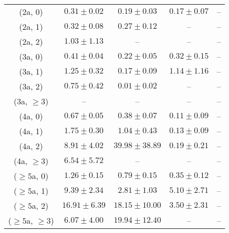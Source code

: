 \begin{table}[h!]
{\begin{tabular}{ccccc}
	(2a, 0) & $0.31\pm 0.02$ & $0.19\pm 0.03$ & $0.17\pm 0.07$ & -- \\[0.5ex] 
	(2a, 1) & $0.32\pm 0.08$ & $0.27\pm 0.12$ & -- & -- \\[0.5ex] 
	(2a, 2) & $1.03\pm 1.13$ & -- & -- & -- \\[0.5ex] 
	(3a, 0) & $0.41\pm 0.04$ & $0.22\pm 0.05$ & $0.32\pm 0.15$ & -- \\[0.5ex] 
	(3a, 1) & $1.25\pm 0.32$ & $0.17\pm 0.09$ & $1.14\pm 1.16$ & -- \\[0.5ex] 
	(3a, 2) & $0.75\pm 0.42$ & $0.01\pm 0.02$ & -- & -- \\[0.5ex] 
	(3a, $\ge3$) & -- & -- & -- & -- \\[0.5ex] 
	(4a, 0) & $0.67\pm 0.05$ & $0.38\pm 0.07$ & $0.11\pm 0.09$ & -- \\[0.5ex] 
	(4a, 1) & $1.75\pm 0.30$ & $1.04\pm 0.43$ & $0.13\pm 0.09$ & -- \\[0.5ex] 
	(4a, 2) & $8.91\pm 4.02$ & $39.98\pm 38.89$ & $0.19\pm 0.21$ & -- \\[0.5ex] 
	(4a, $\ge3$) & $6.54\pm 5.72$ & -- & -- & -- \\[0.5ex] 
	($\ge5$a, 0) & $1.26\pm 0.15$ & $0.79\pm 0.15$ & $0.35\pm 0.12$ & -- \\[0.5ex] 
	($\ge5$a, 1) & $9.39\pm 2.34$ & $2.81\pm 1.03$ & $5.10\pm 2.71$ & -- \\[0.5ex] 
	($\ge5$a, 2) & $16.91\pm 6.39$ & $18.15\pm 10.00$ & $3.50\pm 2.31$ & -- \\[0.5ex] 
	($\ge5$a, $\ge3$) & $6.07\pm 4.00$ & $19.94\pm 12.40$ & -- & -- \\[0.5ex] 
	\hline
	\hline
\end{tabular}}
\end{table}
